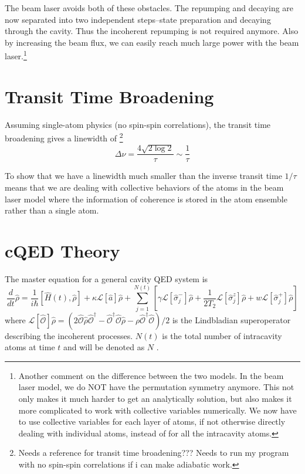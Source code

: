 \documentclass{article}
\newcommand{\lindblad}{\mathcal{L}}
\newcommand{\ope}{\hat{\mathcal{O}}}
\begin{document}
The beam laser avoids both of these obstacles. The repumping and decaying are now separated into two independent steps--state preparation and decaying through the cavity. Thus the incoherent repumping is not required anymore. Also by increasing the beam flux, we can easily reach much large power with the beam laser.\footnote{Another comment on the difference between the two models. In the beam laser model, we do NOT have the permutation symmetry anymore. This not only makes it much harder to get an analytically solution, but also makes it more complicated to work with collective variables numerically. We now have to use collective variables for each layer of atoms, if not otherwise directly dealing with individual atoms, instead of for all the intracavity atoms.}


\section{Transit Time Broadening}
Assuming single-atom physics (no spin-spin correlations), the transit time broadening gives a linewidth of \footnote{Needs a reference for transit time broadening??? Needs to run my program with no spin-spin correlations if i can make adiabatic work.}
\begin{equation}
    \Delta \nu = \frac{4\sqrt{2\log{2}}}{\tau} \sim \frac{1}{\tau}
\end{equation}

To show that we have a linewidth much smaller than the inverse transit time $1/\tau$ means that we are dealing with collective behaviors of the atoms in the beam laser model where the information of coherence is stored in the atom ensemble rather than a single atom.

\section{cQED Theory}
The master equation for a general cavity QED system is
\begin{equation}
\label{masterqed}
\frac{d}{dt}\hat{\rho}=\frac{1}{i\hbar}\left[\hat{H}(t),\hat{\rho}\right]+\kappa\lindblad[\hat{a}]\hat{\rho}+\sum^{N(t)}_{j=1}\left[\gamma \lindblad[\hat{\sigma}^-_j]\hat{\rho}+\frac{1}{2T_2}\lindblad[\hat{\sigma}^z_j]\hat{\rho}+w\lindblad[\hat{\sigma}^+_j]\hat{\rho}\right]
\end{equation}
where $\lindblad[\ope]\hat{\rho} = (2\ope\hat{\rho}\ope^\dagger-\ope^\dagger\ope\hat{\rho}-\rho\ope^\dagger\ope)/2$ is the Lindbladian superoperator describing the incoherent processes. $N(t)$ is the total number of intracavity atoms at time $t$ and will be denoted as $N$ . 
\end{document}
